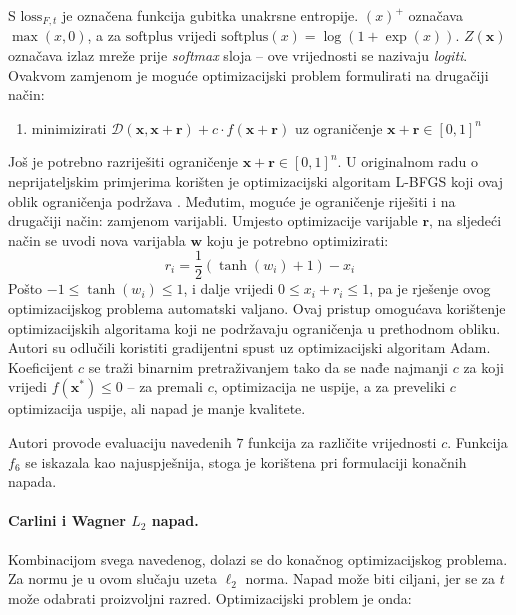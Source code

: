 \documentclass[utf8, diplomski]{fer}
\begin{document}
S $\text{loss}_{F,t}$ je označena funkcija gubitka unakrsne entropije. $(x)^{+}$ označava $\max(x, 0)$, a za $\text{softplus}$ vrijedi $\text{softplus}(x) = \log(1+\exp(x))$. $Z(\boldsymbol{x})$ označava izlaz mreže prije \textit{softmax} sloja -- ove vrijednosti se nazivaju \textit{logiti}. Ovakvom zamjenom je moguće optimizacijski problem formulirati na drugačiji način:

\begin{enumerate}[noitemsep, label={}]
  \item minimizirati $\mathcal{D}(\boldsymbol{x}, \boldsymbol{x} + \boldsymbol{r}) + c\cdot f(\boldsymbol{x} + \boldsymbol{r})$ uz ograničenje $\boldsymbol{x} + \boldsymbol{r} \in [0,1]^{n}$
\end{enumerate}

Još je potrebno razriješiti ograničenje $\boldsymbol{x} + \boldsymbol{r} \in [0,1]^{n}$. U originalnom radu o neprijateljskim primjerima korišten je optimizacijski algoritam L-BFGS koji ovaj oblik ograničenja podržava \citep{Szegedy2014IntriguingPO}. Međutim, moguće je ograničenje riješiti i na drugačiji način: zamjenom varijabli. Umjesto optimizacije varijable $\boldsymbol{r}$, na sljedeći način se uvodi nova varijabla $\boldsymbol{w}$ koju je potrebno optimizirati: 
\begin{equation}
r_{i} = \frac{1}{2}(\tanh(w_{i}) + 1) - x_{i}
\end{equation}
Pošto $-1 \leq \tanh(w_{i}) \leq 1$, i dalje vrijedi $0 \leq x_{i} + r_{i} \leq 1$, pa je rješenje ovog optimizacijskog problema automatski valjano. Ovaj pristup omogućava korištenje optimizacijskih algoritama koji ne podržavaju ograničenja u prethodnom obliku. Autori su odlučili koristiti gradijentni spust uz optimizacijski algoritam Adam. Koeficijent $c$ se traži binarnim pretraživanjem tako da se nađe najmanji $c$ za koji vrijedi $f(\boldsymbol{x}^{*}) \leq 0$ -- za premali $c$, optimizacija ne uspije, a za preveliki $c$ optimizacija uspije, ali napad je manje kvalitete.

Autori provode evaluaciju navedenih $7$ funkcija za različite vrijednosti $c$. Funkcija $f_{6}$ se iskazala kao najuspješnija, stoga je korištena pri formulaciji konačnih napada.

\paragraph{Carlini i Wagner $L_{2}$ napad.} Kombinacijom svega navedenog, dolazi se do konačnog optimizacijskog problema. Za normu je u ovom slučaju uzeta $\ell_{2}$ norma. Napad može biti ciljani, jer se za $t$ može odabrati proizvoljni razred. Optimizacijski problem je onda:
\end{document}
